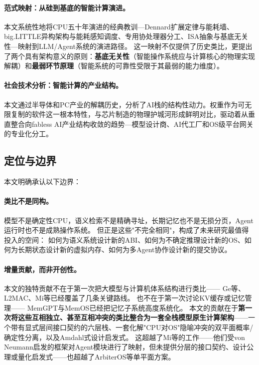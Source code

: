 \paragraph{范式映射：从硅到基底的智能计算演进。}
本文系统性地将CPU五十年演进的经典教训---Dennard扩展定律与能耗墙、big.LITTLE异构架构与能耗感知调度、专用协处理器分工、ISA抽象与基底无关性---映射到LLM/Agent系统的演进路径。
这一映射不仅提供了历史类比，更提出了两个具有架构意义的原则：\textbf{基底无关性}（智能操作系统应与计算核心的物理实现解耦）和\textbf{最弱环节原理}（智能系统的可靠性受限于其最弱的能力维度）。

\paragraph{社会技术分析：智能计算的产业结构。}
本文通过半导体和PC产业的解耦历史，分析了AI栈的结构性动力。权重作为可无限复制的软件这一根本特性，与芯片制造的物理护城河形成鲜明对比，驱动着从垂直整合向fabless AI产业结构收敛的趋势---模型设计商、AI代工厂和OS级平台网关的专业化分工。

\subsection{定位与边界}

本文明确承认以下边界：

\paragraph{类比不是同构。}
模型不是确定性CPU，语义检索不是精确寻址，长期记忆也不是无损分页，Agent运行时也不是成熟操作系统。
但正是这些"不完全相同"，构成了未来研究最值得投入的空间：
如何为语义系统设计新的ABI、如何为不确定推理设计新的OS、如何为长期状态设计新的虚拟内存、如何为多Agent协作设计新的提交协议。

\paragraph{增量贡献，而非开创性。}
本文的独特贡献不在于第一次把大模型与计算机体系结构进行类比——
Ge等\cite{ge2023llmos}、L2MAC\cite{holt2024l2mac}、Mi等\cite{mi2025llmagentscomputersystems}已经覆盖了几条关键路线。
也不在于第一次讨论KV缓存或记忆管理——
MemGPT\cite{memgpt2023}与MemOS\cite{memos2025}已经把记忆子系统高度系统化。
本文的贡献在于\textbf{第一次将这些互相独立、甚至互相冲突的类比整合为一套全栈模型原生计算架构}——一个带有显式层间接口契约的六层栈、一套化解"CPU对OS"隐喻冲突的双平面概率/确定性分离，以及Amdahl式设计启发式。
这超越了Mi等\cite{mi2025llmagentscomputersystems}的工作——他们受von Neumann启发的框架对Agent模块进行了映射，但未提供分层的接口契约、设计公理或量化启发式——也超越了ArbiterOS\cite{arbiteros2025}等单平面方案。

